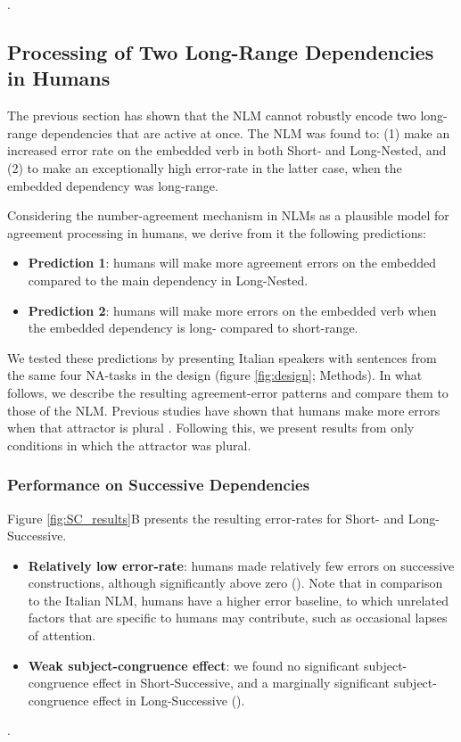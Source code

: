 .

\subsection{Processing of Two Long-Range Dependencies in Humans}
The previous section has shown that the NLM cannot robustly encode two long-range dependencies that are active at once. The NLM was found to: (1) make an increased error rate on the embedded verb in both Short- and Long-Nested, and (2) to make an exceptionally high error-rate in the latter case, when the embedded dependency was long-range.

Considering the number-agreement mechanism in NLMs as a plausible model for agreement processing in humans, we derive from it the following predictions:

\begin{itemize}
    \item \textbf{Prediction 1}: humans will make more agreement errors on the embedded compared to the main dependency in Long-Nested. 
    \item \textbf{Prediction 2}: humans will make more errors on the embedded verb when the embedded dependency is long- compared to short-range.

\end{itemize}
We tested these predictions by presenting Italian speakers with sentences from the same four NA-tasks in the design (figure \ref{fig:design}; Methods). In what follows, we describe the resulting agreement-error patterns and compare them to those of the NLM. Previous studies have shown that humans make more errors when that attractor is plural \citep{Bock:Miller:1991, vigliocco1995constructing, eberhard1997marked, wagers2009agreement, lago2015agreement}. Following this, we present results from only conditions in which the attractor was plural. 

\subsubsection{Performance on Successive Dependencies}
Figure \ref{fig:SC_results}B presents the resulting error-rates for Short- and Long-Successive. 
\begin{itemize}
    \item \textbf{Relatively low error-rate}: humans made relatively few errors on successive constructions, although significantly above zero (). Note that in comparison to the Italian NLM, humans have a higher error baseline, to which unrelated factors that are specific to humans may contribute, such as occasional lapses of attention.
    \item \textbf{Weak subject-congruence effect}: we found no significant subject-congruence effect in Short-Successive, and a marginally significant subject-congruence effect in Long-Successive ().
\end{itemize}
.

